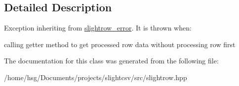 \subsection{Detailed Description}
Exception inheriting from \hyperlink{classutils_1_1slightrow__error}{slightrow\+\_\+error}. It is thrown when\+:
\begin{DoxyItemize}
\item calling getter method to get processed row data without processing row first 
\end{DoxyItemize}

The documentation for this class was generated from the following file\+:\begin{DoxyCompactItemize}
\item 
/home/hsg/\+Documents/projects/slightcsv/src/slightrow.\+hpp\end{DoxyCompactItemize}
